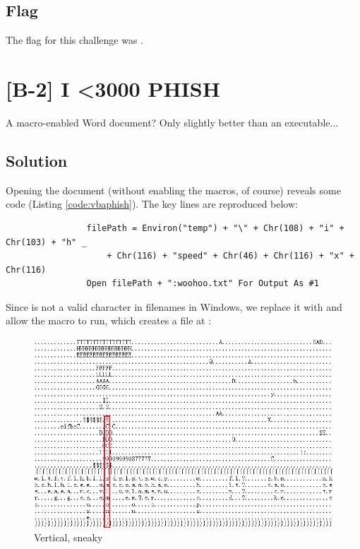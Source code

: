 
	\subsection{Flag}
		The flag for this challenge was .


\pagebreak
\section{[B-2] I <3000 PHISH}

	A macro-enabled Word document? Only slightly better than an executable...

	\subsection{Solution}
		Opening the document (without enabling the macros, of course) reveals some code (Listing \ref{code:vbaphish}). The
		key lines are reproduced below:

		\begin{listing}[!htbp]
			\begin{verbatim}
				filePath = Environ("temp") + "\" + Chr(108) + "i" + Chr(103) + "h" _
					+ Chr(116) + "speed" + Chr(46) + Chr(116) + "x" + Chr(116)
				Open filePath + ":woohoo.txt" For Output As #1
			\end{verbatim}
		\end{listing}

		Since \ttt{:} is not a valid character in filenames in Windows, we replace it with \ttt{\_} and allow the macro
		to run, which creates a file at :

		\begin{figure}[!htbp]\centering
			\includegraphics[width=130mm]{figures/osintblue/b2.png} \vspace{5mm}
			\caption{Vertical, sneaky}
		\end{figure}


